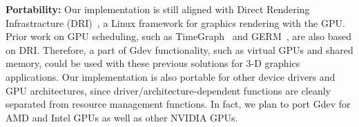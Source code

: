 \textbf{Portability:}
Our implementation is still aligned with Direct Rendering Infrastracture
(DRI)~\cite{DRI}, a Linux framework for graphics rendering with the GPU.
Prior work on GPU scheduling, such as TimeGraph~\cite{Kato_ATC11} and
GERM~\cite{Bautin_MCNC08}, are also based on DRI.
Therefore, a part of Gdev functionality, such as virtual GPUs and shared
memory, could be used with these previous solutions for 3-D graphics
applications.
Our implementation is also portable for other device drivers and GPU
architectures, since driver/architecture-dependent functions are cleanly
separated from resource management functions.
In fact, we plan to port Gdev for AMD and Intel GPUs as well as other
NVIDIA GPUs.
